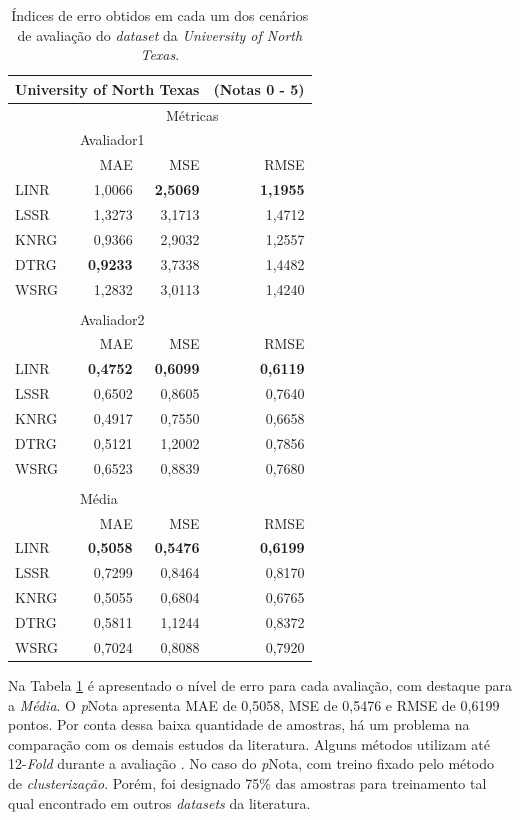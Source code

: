 \begin{table}[!h]
\centering
\caption{Índices de erro obtidos em cada um dos cenários de avaliação do \textit{dataset} da \textit{University of North Texas}.}
\label{tab-UNT}
\begin{tabular}{p{5cm} r r r }
    \hline
    \multicolumn{3}{l}{\textbf{University of North Texas}} & (Notas 0 - 5) \\ \hline
     & \multicolumn{3}{c}{M{\'e}tricas} \\

    & \multicolumn{3}{l}{Avaliador1} \\ \cline{2-4}
     & MAE & MSE & RMSE \\
    LINR & 1,0066 & \textbf{2,5069} & \textbf{1,1955} \\
    LSSR & 1,3273 & 3,1713 & 1,4712 \\
    KNRG & 0,9366 & 2,9032 & 1,2557 \\
    DTRG & \textbf{0,9233} & 3,7338 & 1,4482 \\
    WSRG & 1,2832 & 3,0113 & 1,4240 \\
    \\
    & \multicolumn{3}{l}{Avaliador2} \\ \cline{2-4}
     & MAE & MSE & RMSE \\
    LINR & \textbf{0,4752} & \textbf{0,6099} & \textbf{0,6119} \\
    LSSR & 0,6502 & 0,8605 & 0,7640 \\
    KNRG & 0,4917 & 0,7550 & 0,6658 \\
    DTRG & 0,5121 & 1,2002 & 0,7856 \\
    WSRG & 0,6523 & 0,8839 & 0,7680 \\
    \\
    & \multicolumn{3}{l}{Média} \\ \cline{2-4}
     & MAE & MSE & RMSE \\
    LINR & \textbf{0,5058} & \textbf{0,5476} & \textbf{0,6199} \\
    LSSR & 0,7299 & 0,8464 & 0,8170 \\
    KNRG & 0,5055 & 0,6804 & 0,6765 \\
    DTRG & 0,5811 & 1,1244 & 0,8372 \\
    WSRG & 0,7024 & 0,8088 & 0,7920 \\

    \hline
    \hline
\end{tabular}
\end{table}

Na Tabela \ref{tab-UNT} é apresentado o nível de erro para cada avaliação, com destaque para a \textit{Média}. O \textit{p}Nota apresenta MAE de 0,5058, MSE de 0,5476 e RMSE de 0,6199 pontos. Por conta dessa baixa quantidade de amostras, há um problema na comparação com os demais estudos da literatura. Alguns métodos utilizam até 12-\textit{Fold} durante a avaliação \cite{kumar2017, saha2018}. No caso do \textit{p}Nota, com treino fixado pelo método de \textit{clusterização}. Porém, foi designado 75\% das amostras para treinamento tal qual encontrado em outros \textit{datasets} da literatura.

